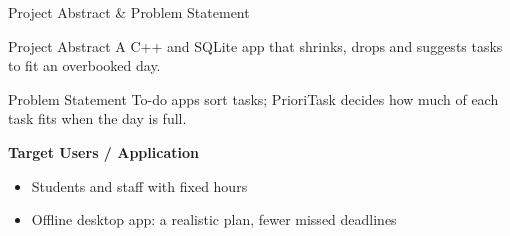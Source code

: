\documentclass[aspectratio=169,11pt]{beamer}
\newcommand{\smallnote}[1]{%
\vspace{0.08cm}
{\scriptsize\color{GEUGrey}#1}
}
\begin{document}
\begin{frame}{Project Abstract \& Problem Statement}

\begin{block}{Project Abstract}
A C++ and SQLite app that shrinks, drops and suggests tasks to fit an overbooked day.
\end{block}


\begin{block}{Problem Statement}
To-do apps sort tasks; PrioriTask decides how much of each task fits when the day is full.
\end{block}

\vspace{2mm}

\textbf{\color{GEUBlue}Target Users / Application}

\begin{itemize}\itemsep2pt
    \item Students and staff with fixed hours
    \item Offline desktop app: a realistic plan, fewer missed deadlines
\end{itemize}

\smallnote{

}

\end{frame}
\end{document}

